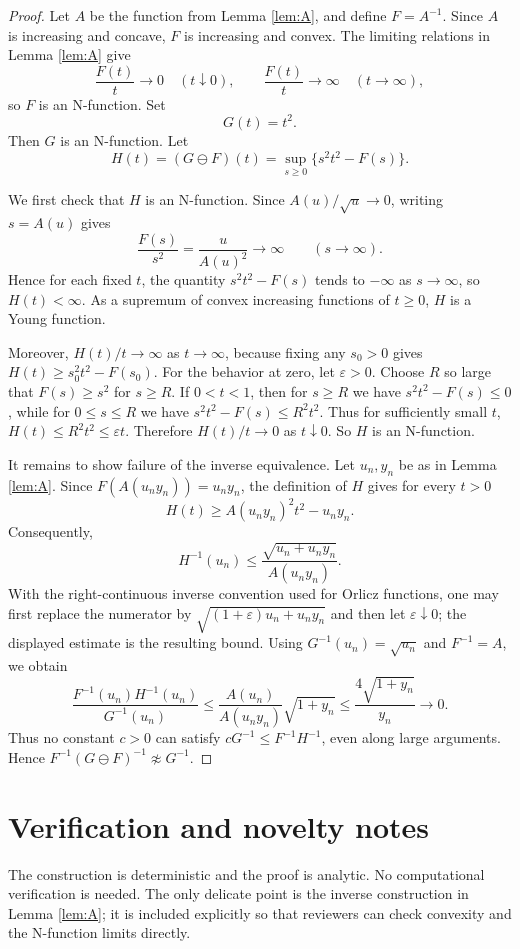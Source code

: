 \documentclass[11pt]{article}
\newcommand{\om}{\ominus}
\begin{document}
\begin{proof}
Let $A$ be the function from Lemma \ref{lem:A}, and define $F=A^{-1}$. Since
$A$ is increasing and concave, $F$ is increasing and convex. The limiting
relations in Lemma \ref{lem:A} give
\[
  \frac{F(t)}{t}\to0\quad(t\downarrow0),\qquad
  \frac{F(t)}{t}\to\infty\quad(t\to\infty),
\]
so $F$ is an N-function. Set
\[
  G(t)=t^2.
\]
Then $G$ is an N-function. Let
\[
  H(t)=(G\om F)(t)=\sup_{s\geq0}\{s^2t^2-F(s)\}.
\]

We first check that $H$ is an N-function. Since $A(u)/\sqrt u\to0$, writing
$s=A(u)$ gives
\[
  \frac{F(s)}{s^2}=\frac{u}{A(u)^2}\to\infty\qquad(s\to\infty).
\]
Hence for each fixed $t$, the quantity $s^2t^2-F(s)$ tends to $-\infty$ as
$s\to\infty$, so $H(t)<\infty$. As a supremum of convex increasing functions of
$t\geq0$, $H$ is a Young function.

Moreover, $H(t)/t\to\infty$ as $t\to\infty$, because fixing any $s_0>0$ gives
$H(t)\geq s_0^2t^2-F(s_0)$. For the behavior at zero, let $\varepsilon>0$.
Choose $R$ so large that $F(s)\geq s^2$ for $s\geq R$. If $0<t<1$, then for
$s\geq R$ we have $s^2t^2-F(s)\leq0$, while for $0\leq s\leq R$ we have
$s^2t^2-F(s)\leq R^2t^2$. Thus for sufficiently small $t$,
$H(t)\leq R^2t^2\leq\varepsilon t$. Therefore $H(t)/t\to0$ as $t\downarrow0$.
So $H$ is an N-function.

It remains to show failure of the inverse equivalence. Let $u_n,y_n$ be as in
Lemma \ref{lem:A}. Since $F(A(u_ny_n))=u_ny_n$, the definition of $H$ gives
for every $t>0$
\[
  H(t)\geq A(u_ny_n)^2t^2-u_ny_n.
\]
Consequently,
\[
  H^{-1}(u_n)\leq
  \frac{\sqrt{u_n+u_ny_n}}{A(u_ny_n)}.
\]
With the right-continuous inverse convention used for Orlicz functions, one may
first replace the numerator by $\sqrt{(1+\varepsilon)u_n+u_ny_n}$ and then let
$\varepsilon\downarrow0$; the displayed estimate is the resulting bound.
Using $G^{-1}(u_n)=\sqrt{u_n}$ and $F^{-1}=A$, we obtain
\[
  \frac{F^{-1}(u_n)H^{-1}(u_n)}{G^{-1}(u_n)}
  \leq
  \frac{A(u_n)}{A(u_ny_n)}\sqrt{1+y_n}
  \leq
  \frac{4\sqrt{1+y_n}}{y_n}\to0.
\]
Thus no constant $c>0$ can satisfy
$cG^{-1}\leq F^{-1}H^{-1}$, even along large arguments. Hence
$F^{-1}(G\om F)^{-1}\not\approx G^{-1}$.
\end{proof}

\section*{Verification and novelty notes}

The construction is deterministic and the proof is analytic. No computational
verification is needed. The only delicate point is the inverse construction in
Lemma \ref{lem:A}; it is included explicitly so that reviewers can check
convexity and the N-function limits directly.
\end{document}
